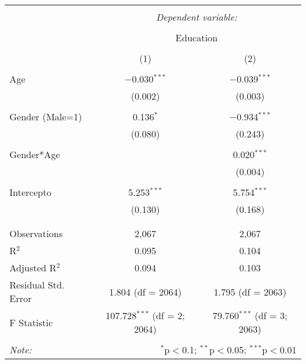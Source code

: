 
\begin{table}[!htbp] \centering 
  \caption{} 
  \label{} 
\begin{tabular}{@{\extracolsep{5pt}}lcc} 
\\[-1.8ex]\hline 
\hline \\[-1.8ex] 
 & \multicolumn{2}{c}{\textit{Dependent variable:}} \\ 
\cline{2-3} 
\\[-1.8ex] & \multicolumn{2}{c}{Education} \\ 
\\[-1.8ex] & (1) & (2)\\ 
\hline \\[-1.8ex] 
 Age & $-$0.030$^{***}$ & $-$0.039$^{***}$ \\ 
  & (0.002) & (0.003) \\ 
  & & \\ 
 Gender (Male=1) & 0.136$^{*}$ & $-$0.934$^{***}$ \\ 
  & (0.080) & (0.243) \\ 
  & & \\ 
 Gender*Age &  & 0.020$^{***}$ \\ 
  &  & (0.004) \\ 
  & & \\ 
 Intercepto & 5.253$^{***}$ & 5.754$^{***}$ \\ 
  & (0.130) & (0.168) \\ 
  & & \\ 
\hline \\[-1.8ex] 
Observations & 2,067 & 2,067 \\ 
R$^{2}$ & 0.095 & 0.104 \\ 
Adjusted R$^{2}$ & 0.094 & 0.103 \\ 
Residual Std. Error & 1.804 (df = 2064) & 1.795 (df = 2063) \\ 
F Statistic & 107.728$^{***}$ (df = 2; 2064) & 79.760$^{***}$ (df = 3; 2063) \\ 
\hline 
\hline \\[-1.8ex] 
\textit{Note:}  & \multicolumn{2}{r}{$^{*}$p$<$0.1; $^{**}$p$<$0.05; $^{***}$p$<$0.01} \\ 
\end{tabular} 
\end{table} 
